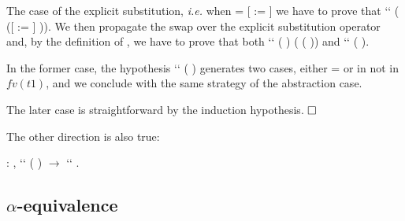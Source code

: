 \begin{coqdoccode}
\end{coqdoccode}
The case of the explicit substitution, {\it i.e.} when  = [ := ] we have to prove that     ``  (   ([ := ] )). We then propagate the swap over the explicit substitution operator and, by the definition of , we have to prove that both     ``  (   ) ( (   )) and     ``  (   ).
\begin{coqdoccode}
\end{coqdoccode}
In the former case, the hypothesis  ``   ( ) generates two cases, either  =  or  in not in $fv(t1)$, and we conclude with the same strategy of the abstraction case.
\begin{coqdoccode}
\end{coqdoccode}
The later case is straightforward by the induction hypothesis. $\hfill\Box$
\begin{coqdoccode}
\coqdocemptyline
\end{coqdoccode}
The other direction is also true:
\begin{coqdoccode}
\coqdocemptyline
\coqdocnoindent
{} : \coqdockw{\ensuremath{\forall}}    ,     ``  (   ) \ensuremath{\rightarrow}  ``  .\coqdoceol
\coqdocemptyline
\coqdocemptyline
\end{coqdoccode}
\subsection{$\alpha$-equivalence}



